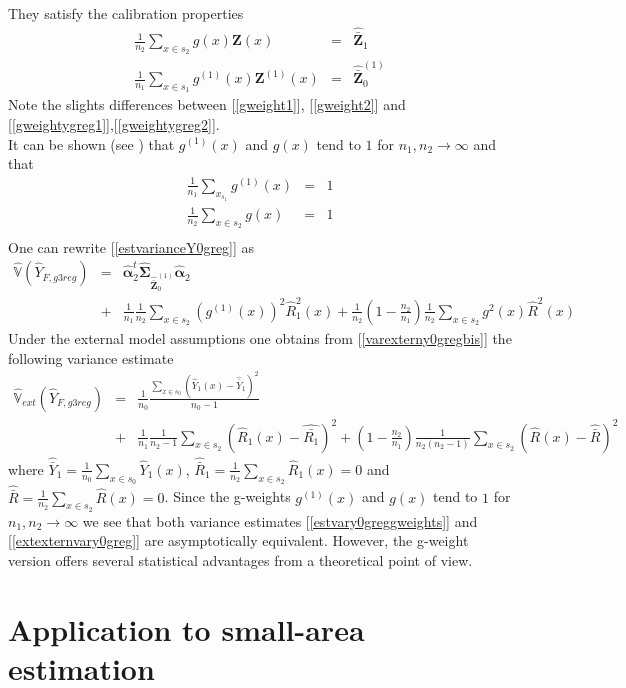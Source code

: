 \documentclass[a4paper,12pt,leqno, titlepage]{article}
\newcommand{\VAR}{\mathbb{V}}
\begin{document}
They satisfy the calibration properties
\begin{eqnarray}\label{gweight2}
\frac{1}{n_2}\sum_{x\in{s}_2}g(x)\pmb{Z}(x)&=&\hat{\bar{\pmb{Z}}}_1 \nonumber \\
\frac{1}{n_1}\sum_{x\in{s}_1}g^{(1)}(x)\pmb{Z}^{(1)}(x)&=&\hat{\bar{\pmb{Z}}}_0^{(1)}
\end{eqnarray}
\noindent Note the slights differences between [\ref{gweight1}], [\ref{gweight2}] and [\ref{gweightygreg1}],[\ref{gweightygreg2}].\\
It can be shown (see \cite{mandallazreport1, mandallazreport2}) that $g^{(1)}(x)$ and $g(x)$ tend to $1$ for $n_1,n_2 \to \infty$ and that
\begin{eqnarray*}
\frac{1}{n_1}\sum_{x_{s_1}}g^{(1)}(x)&=& 1  \\
\frac{1}{n_2}\sum_{x\in{s_2}}g(x)&=& 1\\
\end{eqnarray*}
\noindent One can rewrite [\ref{estvarianceY0greg}] as
\begin{eqnarray}\label{estvary0greggweights}
\hat{\VAR}(\hat{Y}_{F,g3reg})&=&\hat{\pmb{\alpha}}_2^t\hat{\pmb{\Sigma}}_{\hat{\bar{\pmb{Z}}}^{(1)}_0}\hat{\pmb{\alpha}}_2
\nonumber\\
&+&\frac{1}{n_1}\frac{1}{n_2}\sum_{x\in{s}_2}(g^{(1)}(x))^2\hat{R}_1^2(x)+
\frac{1}{n_2}(1-\frac{n_2}{n_1})\frac{1}{n_2}\sum_{x\in{s}_2}g^2(x)\hat{R}^2(x)
\end{eqnarray}
Under the external model assumptions one obtains from [\ref{varexterny0gregbis}] the following variance estimate
\begin{eqnarray}\label{extexternvary0greg}
\hat{\VAR}_{ext}(\hat{Y}_{F,g3reg})&=&\frac{1}{n_0}\frac{\sum_{x\in{s_0}}(\hat{Y}_1(x)-\hat{\bar{Y}}_1)^2}{n_0-1}
\nonumber\\
&+&\frac{1}{n_1}\frac{1}{n_2-1}\sum_{x\in{s}_2}(\hat{R}_1(x)-\hat{\bar{R_1}})^2+
(1-\frac{n_2}{n_1})\frac{1}{n_2(n_2-1)}\sum_{x\in{s}_2}(\hat{R}(x)-\hat{\bar{R}})^2
\end{eqnarray}
\noindent where $\hat{\bar{Y}}_1=\frac{1}{n_0}\sum_{x\in{s_0}}\hat{Y}_1(x)$, $\hat{\bar{R}}_1=\frac{1}{n_2}\sum_{x\in{s_2}}\hat{R}_1(x)=0$ and
$\hat{\bar{R}}=\frac{1}{n_2}\sum_{x\in{s_2}}\hat{R}(x)=0$.
Since the g-weights $g^{(1)}(x)$ and $g(x)$ tend to $1$ for $n_1,n_2 \to \infty$ we see that both variance estimates [\ref{estvary0greggweights}] and [\ref{extexternvary0greg}] are asymptotically equivalent. However, the g-weight version offers several statistical advantages from a theoretical point of view.
\section{Application to small-area estimation}
\end{document}
